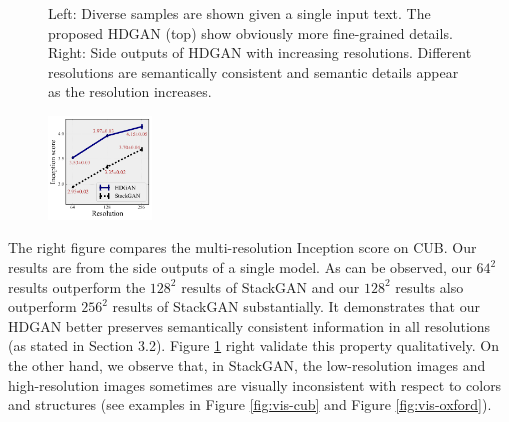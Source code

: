 \documentclass[10pt,twocolumn,letterpaper]{article}
\begin{document}
\begin{figure}[t]
\begin{subfigure}[t]{0.3\textwidth}
	\end{subfigure}
	\vspace{-.2cm}
	\caption{Left: Diverse samples are shown given a single input text. The proposed HDGAN (top) show obviously more fine-grained details. Right: Side outputs of HDGAN with increasing resolutions. Different resolutions are semantically consistent and semantic details appear as the resolution increases.  \label{fig:multiple-test}} 	\vspace{-.3cm}
\end{figure}


\begingroup
\setlength{\intextsep}{-4pt}%
\setlength{\columnsep}{0pt}%
\begin{figure}
	\centering
	\includegraphics[width=0.245\textwidth]{figure/multiscale_inception_2.pdf}
	\vspace{-12pt}
\end{figure}
The right figure compares the multi-resolution Inception score on CUB. Our results are from the side outputs of a single model. As can be observed, our $64^2$ results outperform the $128^2$ results of StackGAN and our $128^2$ results also outperform $256^2$ results of StackGAN substantially. It  demonstrates that our HDGAN better preserves semantically consistent information in all resolutions (as stated in Section 3.2). Figure \ref{fig:multiple-test} right validate this property qualitatively. On the other hand, we observe that, in StackGAN, the low-resolution images and high-resolution images sometimes are visually inconsistent with respect to colors and structures (see examples in Figure \ref{fig:vis-cub} and Figure \ref{fig:vis-oxford}).
\end{document}
